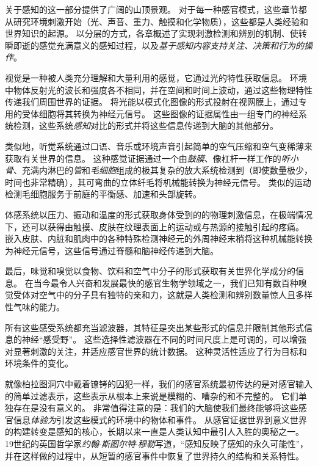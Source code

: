 关于感知的这一部分提供了广阔的山顶景观。
对于每一种感官模式，这些章节都从研究环境刺激开始（光、声音、重力、触摸和化学物质），这些都是人类经验和世界知识的起源。
以分层的方式，各章概述了实现刺激检测和辨别的机制、使转瞬即逝的感觉充满意义的感知过程，以及\textit{基于感知内容支持关注、决策和行为的操作}。


视觉是一种被人类充分理解和大量利用的感觉，它通过光的特性获取信息。
环境中物体反射光的波长和强度各不相同，并在空间和时间上波动，通过这些物理特性传递我们周围世界的证据。
将光能以模式化图像的形式投射在视网膜上，通过专用的受体细胞将其转换为神经元信号。
这些图像的证据属性由一组专门的神经系统检测，这些系统\textit{感知}对比的形式并将这些信息传递到大脑的其他部分。


类似地，听觉系统通过口语、音乐或环境声音引起简单的空气压缩和空气变稀薄来获取有关世界的信息。
这种感觉证据通过一个由\textit{鼓膜}、像杠杆一样工作的\textit{听小骨}、充满内淋巴的\textit{管}和\textit{毛细胞}组成的极其复杂的放大系统检测到（即使数量极少，时间也非常精确），其可弯曲的立体纤毛将机械能转换为神经元信号。
类似的运动检测毛细胞服务于前庭的平衡感、加速和头部旋转。


体感系统以压力、振动和温度的形式获取身体受到的的物理刺激信息，在极端情况下，还可以获得由触摸、皮肤在纹理表面上的运动或与热源的接触引起的疼痛。
嵌入皮肤、内脏和肌肉中的各种特殊检测神经元的外周神经末梢将这种机械能转换为神经元信号，这些信号通过脊髓和脑神经传递到大脑。


最后，味觉和嗅觉以食物、饮料和空气中分子的形式获取有关世界化学成分的信息。
在当今最令人兴奋和发展最快的感官生物学领域之一，我们已知有数百种嗅觉受体对空气中的分子具有独特的亲和力，这就是人类检测和辨别数量惊人且多样性气味的能力。


所有这些感受系统都充当滤波器，其特征是突出某些形式的信息并限制其他形式信息的神经“感受野”。
这些选择性滤波器在不同的时间尺度上是可调的，可以增强对显著刺激的关注，并适应感官世界的统计数据。
这种灵活性适应了行为目标和环境条件的变化。


就像柏拉图洞穴中戴着镣铐的囚犯一样，我们的感官系统最初传达的是对感官输入的简单过滤表示，这些表示从根本上来说是模糊的、嘈杂的和不完整的。
它们单独存在是没有意义的。
非常值得注意的是：我们的大脑使我们最终能够将这些感官信息\textit{体验为}引发这些模式的环境中的物体和事件。
从感官证据世界到意义世界的构建转变是感知的核心，长期以来一直是人类认知中最引人入胜的奥秘之一。
19世纪的英国哲学家\textit{约翰$\cdot$斯图尔特$\cdot$穆勒}写道，“感知反映了感知的永久可能性”，并在这样做的过程中，从短暂的感官事件中恢复了世界持久的结构和关系特性。


